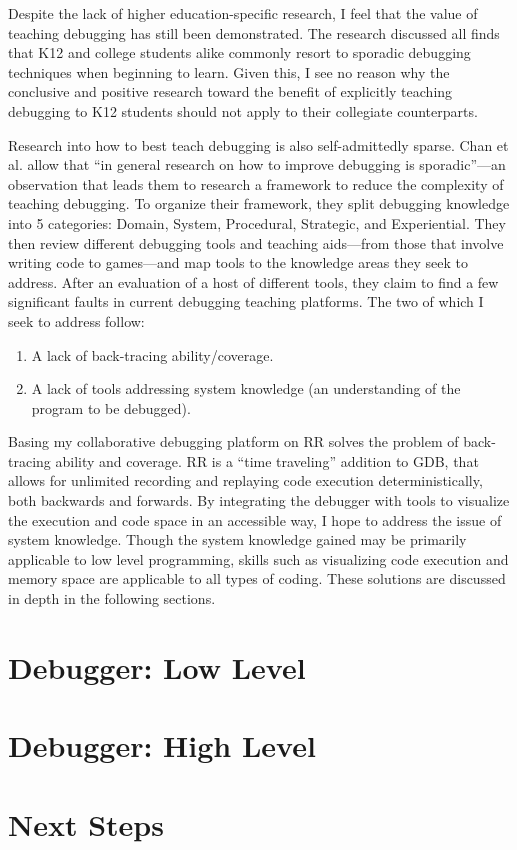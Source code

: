 \documentclass[12pt]{article}
\begin{document}
Despite the lack of higher education-specific research, I feel that
the value of teaching debugging has still been demonstrated.  The
research discussed all finds that K12 and college students alike
commonly resort to sporadic debugging techniques when beginning to
learn.  Given this, I see no reason why the conclusive and positive
research toward the benefit of explicitly teaching debugging to K12
students should not apply to their collegiate counterparts.\par

Research into how to best teach debugging is also self-admittedly
sparse.  Chan et al. allow that ``in general research on how to
improve debugging is sporadic''---an observation that leads them to
research a framework to reduce the complexity of teaching
debugging\cite{10.1145/3286960.3286970}.  To organize their framework,
they split debugging knowledge into 5 categories: Domain, System,
Procedural, Strategic, and Experiential.  They then review different
debugging tools and teaching aids---from those that involve writing
code to games---and map tools to the knowledge areas they seek to
address.  After an evaluation of a host of different tools, they claim
to find a few significant faults in current debugging teaching
platforms.  The two of which I seek to address follow:

\begin{enumerate}
\item A lack of back-tracing ability/coverage.
\item A lack of tools addressing system knowledge (an understanding of
  the program to be debugged).
\end{enumerate}

Basing my collaborative debugging platform on RR solves the problem of
back-tracing ability and coverage.  RR is a ``time traveling''
addition to GDB, that allows for unlimited recording and replaying
code execution deterministically, both backwards and
forwards\cite{DBLP:journals/corr/OCallahanJFHNP17}.  By integrating
the debugger with tools to visualize the execution and code space in
an accessible way, I hope to address the issue of system knowledge.
Though the system knowledge gained may be primarily applicable to low
level programming, skills such as visualizing code execution and
memory space are applicable to all types of coding.  These solutions
are discussed in depth in the following sections.

\section{Debugger: Low Level}

\section{Debugger: High Level}

\section{Next Steps}

\pagebreak

{}
\end{document}
